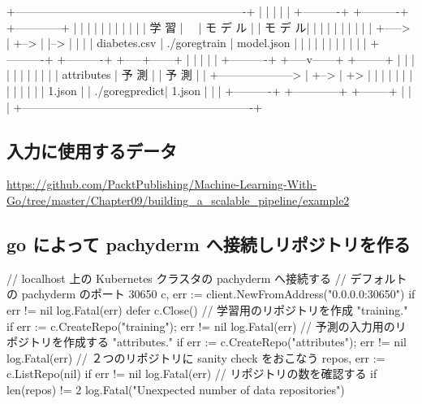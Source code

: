 \documentclass[mingoth,a4paper]{jsarticle}
\begin{document}
\begin{commandline}
     +-------------------------------------------------------------+
     |                                                             |
     |                                                             |
     |  +----------+    +----------+    +------------+             |
     |  |          |    |          |    |            |             |
     |  |  学   習 |  　| モ デ ル |    |  モ  デ  ル|             |
     |  |          |    |          |    |            |             |
+-----> |          +--> |          |--> |            |             |
     |  diabetes.csv    | ./goregtrain  | model.json |             |
     |  |          |    |          |    |            |             |
     |  +----------+    +----------+    +-----+------+             |
     |                                        |                    |
     |                  +----------+    +-----v------+  +--------+ |
     |                  |          |    |            |  |        | |
     |                  | attributes    | 予  測     |  | 予  測 | |
 +--------------------> |          +--> |            +> |        | |
     |                  |          |    |            |  |        | |
     |                  | 1.json   |    | ./goregpredict| 1.json | |
     |                  +----------+    +------------+  +--------+ |
     |                                                             |
     +-------------------------------------------------------------+
\end{commandline}

\subsection{入力に使用するデータ}
\url{https://github.com/PacktPublishing/Machine-Learning-With-Go/tree/master/Chapter09/building_a_scalable_pipeline/example2}

\subsection{go によって pachyderm へ接続しリポジトリを作る}
\begin{commandline}
// localhost 上の Kubernetes クラスタの pachyderm へ接続する
// デフォルトの pachyderm のポート 30650
c, err := client.NewFromAddress("0.0.0.0:30650")
if err != nil {
log.Fatal(err)
}
defer c.Close()
// 学習用のリポジトリを作成 "training."
if err := c.CreateRepo("training"); err != nil {
log.Fatal(err)
}
// 予測の入力用のリポジトリを作成する "attributes."
if err := c.CreateRepo("attributes"); err != nil {
log.Fatal(err)
}
// ２つのリポジトリに sanity check をおこなう
repos, err := c.ListRepo(nil)
if err != nil {
log.Fatal(err)
}
// リポジトリの数を確認する
if len(repos) != 2 {
log.Fatal("Unexpected number of data repositories")
}
\end{commandline}
\end{document}
